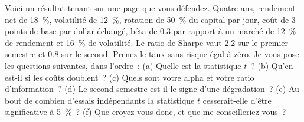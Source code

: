 \begin{question}\label{iq:iv2:your-strategy-and-your-project:20}
Voici un résultat tenant sur une page que vous défendez. Quatre ans, rendement net de 18~\%, volatilité de 12~\%, rotation de 50~\% du capital par jour, coût de 3 points de base par dollar échangé, bêta de 0.3 par rapport à un marché de 12~\% de rendement et 16~\% de volatilité. Le ratio de Sharpe vaut 2.2 sur le premier semestre et 0.8 sur le second. Prenez le taux sans risque égal à zéro. Je vous pose les questions suivantes, dans l'ordre~: (a) Quelle est la statistique $t$~? (b) Qu'en est-il si les coûts doublent~? (c) Quels sont votre alpha et votre ratio d'information~? (d) Le second semestre est-il le signe d'une dégradation~? (e) Au bout de combien d'essais indépendants la statistique $t$ cesserait-elle d'être significative à 5~\%~? (f) Que croyez-vous donc, et que me conseilleriez-vous~?
\end{question}

